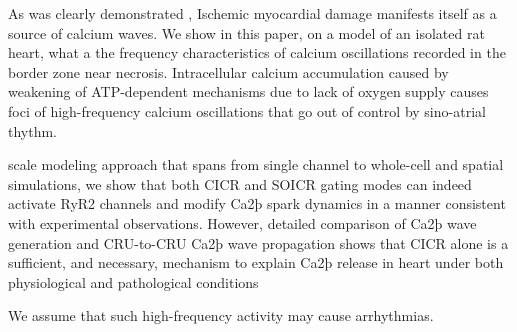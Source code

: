 \documentclass[a4paper,12pt]{article}
\begin{document}
As was clearly demonstrated \cite{matsuura2018intravital},
Ischemic myocardial damage manifests itself as a source of calcium waves.
We show in this paper, on a model of an isolated rat heart, what a the frequency characteristics of calcium oscillations recorded in the border zone near necrosis.
Intracellular calcium accumulation caused by weakening of ATP-dependent mechanisms due to lack of oxygen supply causes foci of high-frequency calcium oscillations that go out of control by sino-atrial thythm.

scale modeling approach that spans from single channel to whole-cell and spatial
simulations, we show that both CICR and SOICR gating modes can indeed activate RyR2 channels and modify Ca2þ spark dynamics in a manner consistent
with experimental observations. However, detailed comparison of Ca2þ wave
generation and CRU-to-CRU Ca2þ wave propagation shows that CICR alone
is a sufficient, and necessary, mechanism to explain Ca2þ release in heart under
both physiological and pathological conditions
\cite{williams2017does}

We assume that such high-frequency activity may cause arrhythmias.
\end{document}

